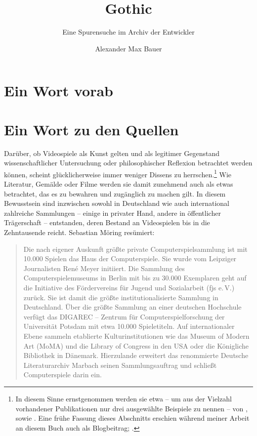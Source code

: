 \documentclass[a5paper,pagesize,numbers=noenddot]{scrbook}
\title{Gothic}
\subtitle{Eine Spurensuche im Archiv der Entwickler}
\author{Alexander Max Bauer}
\date{}
\begin{document}
\maketitle


\frontmatter
\tableofcontents


\mainmatter
\chapter{Ein Wort vorab}\label{ch:vorwort}


\chapter{Ein Wort zu den Quellen}\label{ch:quellen}
Darüber, ob Videospiele als Kunst gelten und als legitimer Gegenstand wissenschaftlicher Untersuchung oder philosophischer Reflexion betrachtet werden können, scheint glücklicherweise immer weniger Dissens zu herrschen.\footnote{In diesem Sinne ernstgenommen werden sie etwa -- um aus der Vielzahl vorhandener Publikationen nur drei ausgewählte Beispiele zu nennen -- von \autocite{feige_computerspiele_2015}, \autocite{zimmermann_gameskultur_2020} sowie \autocite{beil_game_2018}. Eine frühe Fassung dieses Abschnitts erschien während meiner Arbeit an diesem Buch auch als Blogbeitrag; \autocite[vgl.][]{bauer_sammeln_2025}.}
Wie Literatur, Gemälde oder Filme werden sie damit zunehmend auch als etwas betrachtet, das es zu bewahren und zugänglich zu machen gilt.
In diesem Bewusstsein sind inzwischen sowohl in Deutschland wie auch international zahlreiche Sammlungen -- einige in privater Hand, andere in öffentlicher Trägerschaft -- entstanden, deren Bestand an Videospielen bis in die Zehntausende reicht.
Sebastian Möring resümiert:

\begin{quote}
   Die nach eigener Auskunft größte private Computerspielsammlung ist mit 10.000 Spielen das Haus der Computerspiele.
   Sie wurde vom Leipziger Journalisten René Meyer initiiert.
   Die Sammlung des Computerspielemuseums in Berlin mit bis zu 30.000 Exemplaren geht auf die Initiative des Fördervereins für Jugend und Sozialarbeit (fjs e.\,V.) zurück.
   Sie ist damit die größte institutionalisierte Sammlung in Deutschland.
   Über die größte Sammlung an einer deutschen Hochschule verfügt das DIGAREC -- Zentrum für Computerspielforschung der Universität Potsdam mit etwa 10.000 Spieletiteln.
   Auf internationaler Ebene sammeln etablierte Kulturinstitutionen wie das Museum of Modern Art (MoMA) und die Library of Congress in den USA oder die Königliche Bibliothek in Dänemark.
   Hierzulande erweitert das renommierte Deutsche Literaturarchiv Marbach seinen Sammlungsauftrag und schließt Computerspiele darin ein.\autocite[S.~120]{moering_kulturarchive_2020}
\end{quote}
\end{document}
